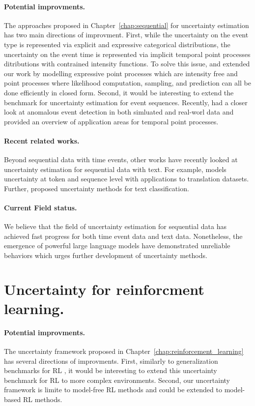 \paragraph{Potential improvments.} The approaches proposed in Chapter~\ref{chap:sequential} for uncertainty estimation has two main directions of improvment. First, while the uncertainty on the event type is represented via explicit and expressive categorical distributions, the uncertainty on the event time is represented via implicit temporal point processes ditributions with contrained intensity functions. To solve this issue, \cite{shchur2020intensity} and \cite{shchur2020fast} extended our work by modelling expressive point processes which are intensity free and point processes where likelihood computation, sampling, and prediction can all be done efficiently in closed form. Second, it would be interesting to extend the benchmark for uncertainty estimation for event sequences. Recently, \cite{shchur2021detecting} had a closer look at anomalous event detection in both simluated and real-worl data and \cite{shchur2021review} provided an overview of application areas for temporal point processes. 

\paragraph{Recent related works.} Beyond sequential data with time events, other works have recently looked at uncertainty estimation for sequential data with text. For example, \cite{malinin2021uncertainty} models uncertainty at token and sequence level with applications to translation datasets. Further, \cite{he2020toward, hu2021uncertainty} proposed uncertainty methods for text classification.

\paragraph{Current Field status.} We believe that the field of uncertainty estimation for sequential data has achieved fast progress for both time event data and text data. Nonetheless, the emergence of powerful large language models have demonstrated unreliable behaviors which urges further development of uncertainty methods. 

\section{Uncertainty for reinforcment learning.}

\paragraph{Potential improvments.} The uncertainty framework proposed in Chapter~\ref{chap:reinforcement_learning} has several directions of improvments. First, similarly to generalization benchmarks for RL \cite{generalization-rl-survey, assessing-generalization-rl, qyantifying-generalization-rl, procgen}, it would be interesting to extend this uncertainty benchmark for RL to more complex environments. Second, our uncertainty framework is limite to model-free RL methods and could be extended to model-based RL methods. 


